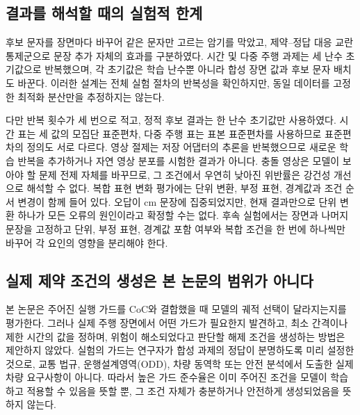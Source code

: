 \subsection{결과를 해석할 때의 실험적 한계}

후보 문자를 장면마다 바꾸어 같은 문자만 고르는 암기를 막았고, 제약--정답 대응 교란 통제군으로 문장 추가 자체의 효과를 구분하였다. 시간 및 다중 주행 과제는 세 난수 초기값으로 반복했으며, 각 초기값은 학습 난수뿐 아니라 합성 장면 값과 후보 문자 배치도 바꾼다. 이러한 설계는 전체 실험 절차의 반복성을 확인하지만, 동일 데이터를 고정한 최적화 분산만을 추정하지는 않는다.

다만 반복 횟수가 세 번으로 적고, 정적 후보 결과는 한 난수 초기값만 사용하였다. 시간 표는 세 값의 모집단 표준편차, 다중 주행 표는 표본 표준편차를 사용하므로 표준편차의 정의도 서로 다르다. 영상 절제는 저장 어댑터의 추론을 반복했으므로 새로운 학습 반복을 추가하거나 자연 영상 분포를 시험한 결과가 아니다. 충돌 영상은 모델이 보아야 할 문제 전제 자체를 바꾸므로, 그 조건에서 우연히 낮아진 위반률은 강건성 개선으로 해석할 수 없다. 복합 표현 변화 평가에는 단위 변환, 부정 표현, 경계값과 조건 순서 변경이 함께 들어 있다. 오답이 cm 문장에 집중되었지만, 현재 결과만으로 단위 변환 하나가 모든 오류의 원인이라고 확정할 수는 없다. 후속 실험에서는 장면과 나머지 문장을 고정하고 단위, 부정 표현, 경계값 포함 여부와 복합 조건을 한 번에 하나씩만 바꾸어 각 요인의 영향을 분리해야 한다.


\subsection{실제 제약 조건의 생성은 본 논문의 범위가 아니다}

본 논문은 주어진 실행 가드를 CoC와 결합했을 때 모델의 궤적 선택이 달라지는지를 평가한다. 그러나 실제 주행 장면에서 어떤 가드가 필요한지 발견하고, 최소 간격이나 제한 시간의 값을 정하며, 위험이 해소되었다고 판단할 해제 조건을 생성하는 방법은 제안하지 않았다. 실험의 가드는 연구자가 합성 과제의 정답이 분명하도록 미리 설정한 것으로, 교통 법규, 운행설계영역(ODD), 차량 동역학 또는 안전 분석에서 도출한 실제 차량 요구사항이 아니다. 따라서 높은 가드 준수율은 이미 주어진 조건을 모델이 학습하고 적용할 수 있음을 뜻할 뿐, 그 조건 자체가 충분하거나 안전하게 생성되었음을 뜻하지 않는다.

